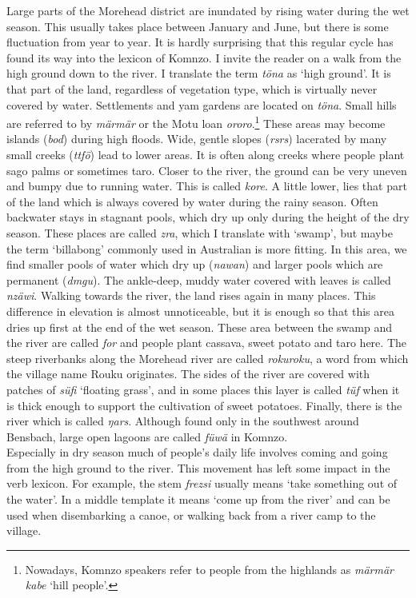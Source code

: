 Large parts of the Morehead district are inundated by rising water during the wet season. This usually takes place between January and June, but there is some fluctuation from year to year. It is hardly surprising that this regular cycle has found its way into the lexicon of Komnzo. I invite the reader on a walk from the high ground down to the river. I translate the term \emph{töna} as `high ground'. It is that part of the land, regardless of vegetation type, which is virtually never covered by water. Settlements and yam gardens are located on \emph{töna}. Small hills are referred to by \emph{märmär} or the Motu loan \emph{ororo}.\footnote{Nowadays, Komnzo speakers refer to people from the highlands as \emph{märmär kabe} `hill people'.} These areas may become islands (\emph{bod}) during high floods. Wide, gentle slopes (\emph{rsrs}) lacerated by many small creeks (\emph{ttfö}) lead to lower areas. It is often along creeks where people plant sago palms or sometimes taro. Closer to the river, the ground can be very uneven and bumpy due to running water. This is called \emph{kore}. A little lower, lies that part of the land which is always covered by water during the rainy season. Often backwater stays in stagnant pools, which dry up only during the height of the dry season. These places are called \emph{zra}, which I translate with `swamp', but maybe the term `billabong' commonly used in Australian  is more fitting. In this area, we find smaller pools of water which dry up  (\emph{nawan}) and larger pools which are permanent (\emph{dmgu}). The ankle-deep, muddy water covered with leaves is called \emph{nzäwi}. Walking towards the river, the land rises again in many places. This difference in elevation is almost unnoticeable, but it is enough so that this area dries up first at the end of the wet season. These area between the swamp and the river are called \emph{for} and people plant cassava, sweet potato and taro here. The steep riverbanks along the Morehead river are called \emph{rokuroku}, a word from which the village name Rouku originates. The sides of the river are covered with patches of \emph{süfi} `floating grass', and in some places this layer is called \emph{tüf} when it is thick enough to support the cultivation of sweet potatoes. Finally, there is the river which is called \emph{ŋars}. Although found only in the southwest around Bensbach, large open lagoons are called \emph{füwä} in Komnzo.\\

Especially in dry season much of people's daily life involves coming and going from the high ground to the river. This movement has left some impact in the verb lexicon. For example, the stem \emph{frezsi} usually means `take something out of the water'. In a middle template it means `come up from the river' and can be used when disembarking a canoe, or walking back from a river camp to the village.\\

